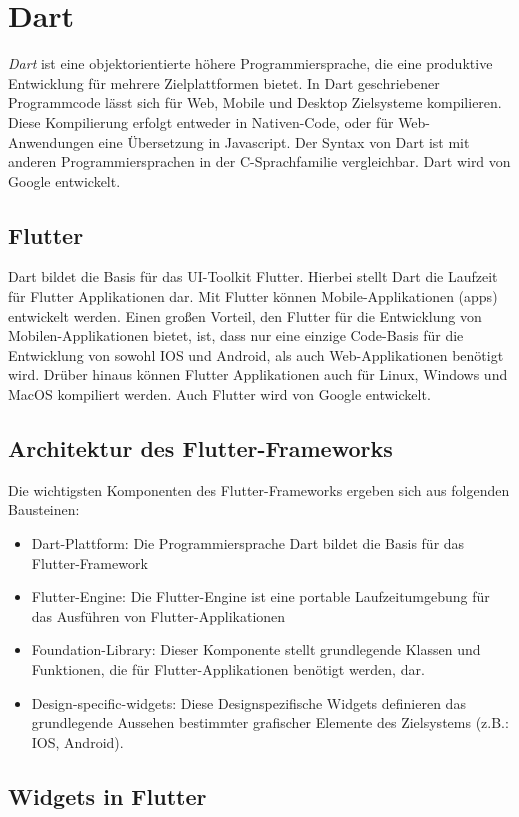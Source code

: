 \section{Dart}
\label{dart}

\textit{Dart} ist eine objektorientierte höhere Programmiersprache, die eine produktive Entwicklung für
mehrere Zielplattformen bietet. In Dart geschriebener Programmcode lässt sich für Web, Mobile und 
Desktop Zielsysteme kompilieren. 
Diese Kompilierung erfolgt entweder in Nativen-Code, oder für Web-Anwendungen eine Übersetzung in Javascript.
Der Syntax von Dart ist mit anderen Programmiersprachen in der C-Sprachfamilie vergleichbar.
Dart wird von Google entwickelt.
\cite{dartwikipedia}

\subsection{Flutter}
Dart bildet die Basis für das UI-Toolkit Flutter. Hierbei stellt Dart die Laufzeit für Flutter Applikationen dar.
Mit Flutter können Mobile-Applikationen (apps) entwickelt werden. 
Einen großen Vorteil, den Flutter für die Entwicklung von Mobilen-Applikationen bietet, ist, 
dass nur eine einzige Code-Basis für die Entwicklung von sowohl IOS und Android, als auch Web-Applikationen benötigt wird.
Drüber hinaus können Flutter Applikationen auch für Linux, Windows und MacOS kompiliert werden. 
Auch Flutter wird von Google entwickelt.
\cite{flutterwikipedia}

\subsection{Architektur des Flutter-Frameworks}
Die wichtigsten Komponenten des Flutter-Frameworks ergeben sich aus folgenden Bausteinen:
\begin{itemize}
    \item Dart-Plattform: Die Programmiersprache Dart bildet die Basis für das Flutter-Framework
    \item Flutter-Engine: Die Flutter-Engine ist eine portable Laufzeitumgebung für das Ausführen von Flutter-Applikationen
    \item Foundation-Library: Dieser Komponente stellt grundlegende Klassen und Funktionen, die für 
    Flutter-Applikationen benötigt werden, dar.
    \item Design-specific-widgets: Diese Designspezifische Widgets definieren das grundlegende Aussehen
    bestimmter grafischer Elemente des Zielsystems (z.B.: IOS, Android).
\end{itemize}

\subsection{Widgets in Flutter}